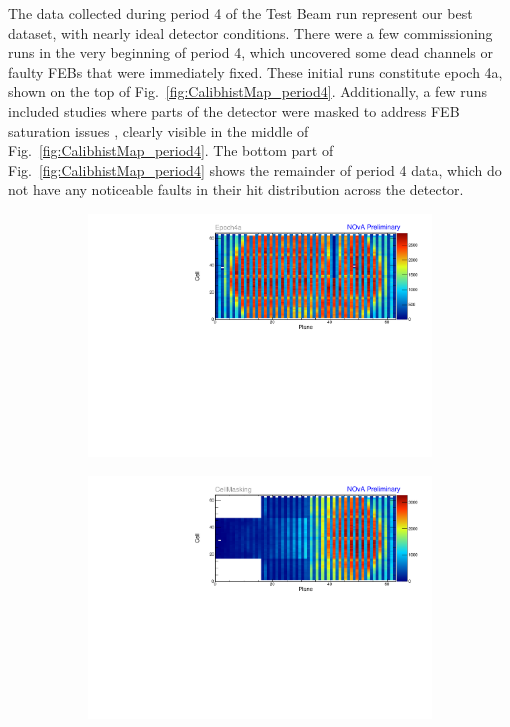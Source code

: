 The data collected during period 4 of the Test Beam run represent our best dataset, with nearly ideal detector conditions. There were a few commissioning runs in the very beginning of period 4, which uncovered some dead channels or faulty \glspl{FEB} that were immediately fixed. These initial runs constitute epoch 4a, shown on the top of Fig.~\ref{fig:CalibhistMap_period4}. Additionally, a few runs included studies where parts of the detector were masked to address \gls{FEB} saturation issues \cite{NOvA-doc-53658}, clearly visible in the middle of Fig.~\ref{fig:CalibhistMap_period4}. The bottom part of Fig.~\ref{fig:CalibhistMap_period4} shows the remainder of period 4 data, which do not have any noticeable faults in their hit distribution across the detector.

\begin{figure}[!hbtp]
\centering
\begin{subfigure}[b]{\textwidth}
\centering
\includegraphics[width=\textwidth]{Plots/TBCalibration/Attenprofs_P4Data_CellPlane_Epoch4a.pdf}
\end{subfigure}
\begin{subfigure}[b]{\textwidth}
\centering
\includegraphics[width=\textwidth]{Plots/TBCalibration/Attenprofs_P4Data_CellPlane_CellMasking.pdf}

\end{subfigure}
\end{figure}
